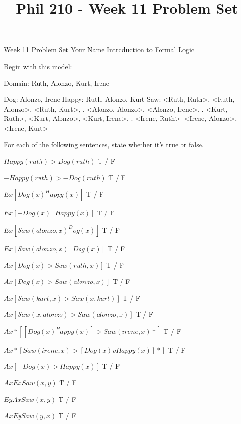 
\title{Phil 210 - Week 11 Problem Set}

\heading
Week 11 Problem Set
Your Name
Introduction to Formal Logic
\endheading

Begin with this model:

\answer
	\firstordermodel 
	Domain: Ruth, Alonzo, Kurt, Irene

	Dog:    Alonzo, Irene
	Happy:  Ruth, Alonzo, Kurt
	Saw:    <Ruth, Ruth>, <Ruth, Alonzo>, <Ruth, Kurt>,
	   .    <Alonzo, Alonzo>, <Alonzo, Irene>,
	   .    <Kurt, Ruth>, <Kurt, Alonzo>, <Kurt, Irene>,
	   .    <Irene, Ruth>, <Irene, Alonzo>, <Irene, Kurt>
	\endfirstordermodel
\endanswer\bigskip

For each of the following sentences, state whether it's true or false.

\quantifiers
\problems
{}
$ Happy(ruth) > Dog(ruth) $
	\answer
	 T / F
	\endanswer

$ -Happy(ruth) > -Dog(ruth) $
	\answer
	 T / F
	\endanswer

$ Ex[Dog(x) ^ Happy(x)] $
	\answer
	 T / F
	\endanswer

$ Ex[-Dog(x) ^ -Happy(x)] $
	\answer
	 T / F
	\endanswer

$ Ex[Saw(alonzo,x) ^ Dog(x)] $
	\answer
	 T / F
	\endanswer

$ Ex[Saw(alonzo,x) ^ -Dog(x)] $
	\answer
	 T / F
	\endanswer

$ Ax[Dog(x) > Saw(ruth,x)] $
	\answer
	 T / F
	\endanswer

$ Ax[Dog(x) > Saw(alonzo,x)] $
	\answer
	 T / F
	\endanswer

$ Ax[Saw(kurt,x) > Saw(x,kurt)] $
	\answer
	 T / F
	\endanswer

$ Ax[Saw(x,alonzo) > Saw(alonzo,x)] $
	\answer
	 T / F
	\endanswer

$ Ax*[[Dog(x) ^ Happy(x)] > Saw(irene,x)*] $
	\answer
	 T / F
	\endanswer

$ Ax*[Saw(irene,x) > [Dog(x) v Happy(x)]*] $
	\answer
	 T / F
	\endanswer

$ Ax[-Dog(x) > Happy(x)] $
	\answer
	 T / F
	\endanswer

$ Ax Ex Saw(x,y) $
	\answer
	 T / F
	\endanswer

$ Ey Ax Saw(x,y) $
	\answer
	 T / F
	\endanswer

$ Ax Ey Saw(y,x) $
	\answer
	 T / F
	\endanswer


